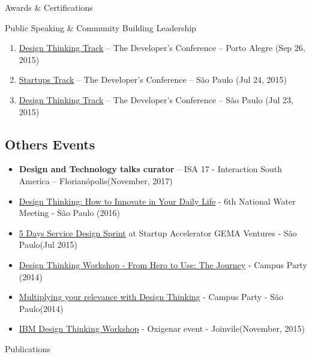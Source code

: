 \documentclass{resume} %
\begin{document}
\begin{rSection}{Awards \& Certifications}
\begin{rSection}{Public Speaking \& Community Building Leadership}
\begin{enumerate}
    \item  \href{https://thedevconf.com/tdc/2015/portoalegre/trilha-design-thinking}{Design Thinking Track} -- The Developer's Conference -- Porto Alegre (Sep 26, 2015)
    \item  \href{https://thedevconf.com/tdc/2015/saopaulo/trilha-startups}{Startups Track} -- The Developer's Conference -- São Paulo (Jul 24, 2015)
    \item  \href{https://thedevconf.com/tdc/2015/saopaulo/trilha-design-thinking}{Design Thinking Track} -- The Developer's Conference -- São Paulo (Jul 23, 2015)
\end{enumerate}

\subsection*{Others Events}
\begin{itemize}
    \item \textbf{Design and Technology talks curator} -- ISA 17 - Interaction South America -- Florianópolis(November, 2017)
    \item \href{https://abconsindcon.com.br/wp-content/uploads/2018/06/6%C2%BA-ENA-Design-Thinking-como-inovar-no-seu-dia-a-dia.pdf}{Design Thinking: How to Innovate in Your Daily Life} - 6th National Water Meeting - São Paulo (2016)
    \item \href{https://www.slideshare.net/AdilsonJardim/acelerando-startups-com-design-thinking-sprints}{5 Days Service Design Sprint} at Startup Accelerator GEMA Ventures - São Paulo(Jul 2015)
    \item \href{https://www.youtube.com/watch?v=VS_Li3JvjvU&list=PLXHrMWvxds3HRIkAzHRwV9AZtRmi7u6jP&index=13}{Design Thinking Workshop - From Hero to Use: The Journey} - Campus Party (2014) 
    \item \href{https://www.youtube.com/watch?v=1XSBNXPtRyc&list=PLXHrMWvxds3HRIkAzHRwV9AZtRmi7u6jP&index=13}{Multiplying your relevance with Design Thinking} - Campus Party - São Paulo(2014)     
    \item \href{https://www.slideshare.net/slideshow/ibm-design-studio-brasil-ibm-design-thinking-workshop-oxigenar-2015-55750688/55750688} {IBM Design Thinking Workshop} - Oxigenar event -  Joinvile(November, 2015)
\end{itemize}

\end{rSection}

\begin{rSection}{Publications} 


\end{rSection}
\end{rSection}
\end{document}
